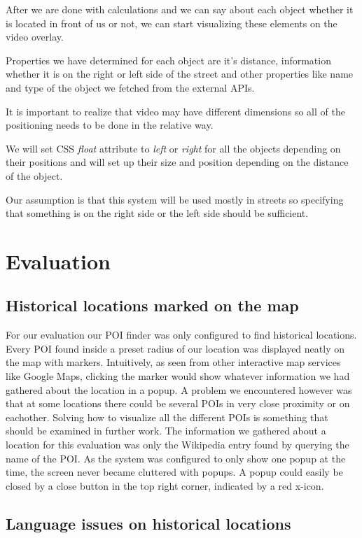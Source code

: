 \documentclass[journal]{IEEEtran}
\begin{document}
After we are done with calculations and we can say about each object whether it is located in front of us or not, we can start visualizing these elements on the video overlay.

Properties we have determined for each object are it's distance, information whether it is on the right or left side of the street and other properties like name and type of the object we fetched from the external APIs.

It is important to realize that video may have different dimensions so all of the positioning needs to be done in the relative way.

We will set CSS \textit{float} attribute to \textit{left} or \textit{right} for all the objects depending on their positions and will set up their size and position depending on the distance of the object.

Our assumption is that this system will be used mostly in streets so specifying that something is on the right side or the left side should be sufficient.

\section{Evaluation}

\subsection{Historical locations marked on the map}
For our evaluation our POI finder was only configured to find historical locations. Every POI found inside a preset radius of our location was displayed neatly on the map with markers. Intuitively, as seen from other interactive map services like Google Maps\cite{google-maps}, clicking the marker would show whatever information we had gathered about the location in a popup. A problem we encountered however was that at some locations there could be several POIs in very close proximity or on eachother. Solving how to visualize all the different POIs is something that should be examined in further work. The information we gathered about a location for this evaluation was only the Wikipedia entry found by querying the name of the POI. As the system was configured to only show one popup at the time, the screen never became cluttered with popups. A popup could easily be closed by a close button in the top right corner, indicated by a red x-icon.

\subsection{Language issues on historical locations}
\end{document}
